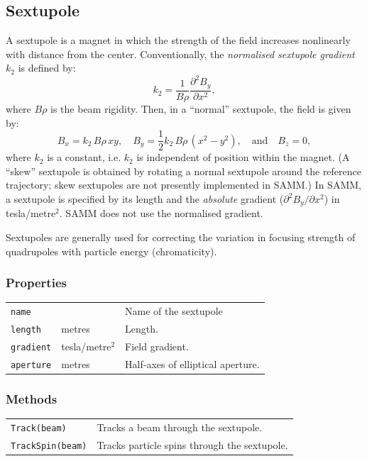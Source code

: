 \documentclass[11pt,twoside,a4paper]{article}
\begin{document}

\subsection{Sextupole}
A sextupole is a magnet in which the strength of the field increases
nonlinearly with distance from the center.  Conventionally, the
\emph{normalised sextupole gradient} $k_2$ is defined by:
\[
k_2 = \frac{1}{B\rho} \frac{\partial^2 B_y}{\partial x^2},
\]
where $B\rho$ is the beam rigidity.  Then, in a ``normal'' sextupole, the field
is given by:
\[
B_x = k_2\,B\rho\, x y, \quad
B_y = \frac{1}{2} k_2\,B\rho\, (x^2 - y^2),  \quad \textrm{and} \quad
B_z = 0, 
\]
where $k_2$ is a constant, i.e. $k_2$ is independent of position within the magnet.
(A ``skew'' sextupole is obtained by rotating a normal sextupole around the
reference trajectory; skew sextupoles are not presently implemented in SAMM.)
In SAMM, a sextupole is specified by its length and the \emph{absolute} gradient
($\partial^2 B_y / \partial x^2$) in tesla/metre$^2$.  SAMM does not use the normalised
gradient.

Sextupoles are generally used for correcting the variation in focusing strength of
quadrupoles with particle energy (chromaticity).

\subsubsection{Properties}

\begin{tabular}{|l|l|l|}
\hline
\texttt{name} &              & Name of the sextupole \\
\texttt{length}              & metres       & Length.                     \\
\texttt{gradient}            & tesla/metre$^2$  & Field gradient. \\
\texttt{aperture} & metres & Half-axes of elliptical aperture. \\
\hline
\end{tabular}
\vspace{0.2in}

\subsubsection{Methods}

\begin{tabular}{|l|l|}
\hline
\texttt{Track(beam)} & Tracks a beam through the sextupole. \\
\texttt{TrackSpin(beam)} & Tracks particle spins through the sextupole. \\
\hline
\end{tabular}
\vspace{0.2in}
\end{document}
